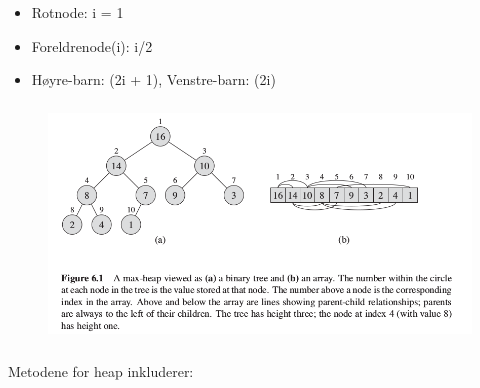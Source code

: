 \documentclass[12pt]{report}
\begin{document}
\begin{itemize}
	\item Rotnode: i = 1\par

	\item Foreldrenode(i): i/2 \par

	\item Høyre-barn: (2i + 1), Venstre-barn: (2i) 
\end{itemize}\par




\begin{figure}[H]
	\begin{Center}
		\includegraphics[width=5.17in,height=2.5in]{./media/image86.png}
	\end{Center}
\end{figure}



\setlength{\parskip}{10.56pt}
\par

{\fontsize{13pt}{15.6pt}\selectfont Metodene for heap inkluderer:\par}\par



\end{document}
